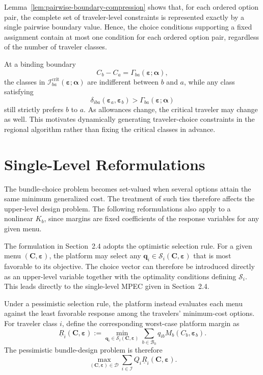 \documentclass{article}
\begin{document}
Lemma~\ref{lem:pairwise-boundary-compression} shows that, for each
ordered option pair, the complete set of traveler-level constraints is
represented exactly by a single pairwise boundary value. Hence, the
choice conditions supporting a fixed assignment contain at most
one condition for each ordered option pair, regardless of the number of
traveler classes.

At a binding boundary
\begin{equation}
    C_b-C_a
    =
    \Gamma_{ba}(\bm\varepsilon;\bm\alpha),
    \label{eq:binding-pairwise-boundary}
\end{equation}
the classes in
$\mathcal I^{\mathrm{crit}}_{ba}(\bm\varepsilon;\bm\alpha)$
are indifferent between $b$ and $a$, while any class satisfying
\begin{equation}
    \delta_{iba}(\bm\varepsilon_a,\bm\varepsilon_b)
    >
    \Gamma_{ba}(\bm\varepsilon;\bm\alpha)
\end{equation}
still strictly prefers $b$ to $a$. As allowances change, the critical
traveler may change as well. This motivates dynamically generating
traveler-choice constraints in the regional algorithm rather than fixing
the critical classes in advance.

\section{Single-Level Reformulations}
\label{sec:single-level-reformulations}

The bundle-choice problem becomes set-valued when several options attain
the same minimum generalized cost. The treatment of such ties therefore
affects the upper-level design problem. The following reformulations also
apply to a nonlinear $K_b$, since margins are fixed coefficients of the
response variables for any given menu.

The formulation in Section~2.4 adopts the optimistic selection rule.
For a given menu $(\bm C,\bm\varepsilon)$, the platform may select any
$\bm q_i\in\mathcal S_i(\bm C,\bm\varepsilon)$ that is most favorable
to its objective. The choice vector can therefore be introduced directly
as an upper-level variable together with the optimality conditions
defining $\mathcal S_i$. This leads directly to the single-level MPEC
given in Section~2.4.

Under a pessimistic selection rule, the platform instead evaluates each
menu against the least favorable response among the travelers'
minimum-cost options. For traveler class $i$, define the corresponding
worst-case platform margin as
\begin{equation}
    \underline{R}_i(\bm C,\bm\varepsilon)
    :=
    \min_{\bm q_i\in\mathcal S_i(\bm C,\bm\varepsilon)}
    \sum_{b\in\mathcal B_0}
    q_{ib}M_b(C_b,\bm\varepsilon_b).
    \label{eq:pessimistic-class-margin}
\end{equation}
The pessimistic bundle-design problem is therefore
\begin{equation}
    \max_{(\bm C,\bm\varepsilon)\in\mathcal D}
    \sum_{i\in\mathcal I}
    Q_i\underline{R}_i(\bm C,\bm\varepsilon).
    \label{eq:pessimistic-design}
\end{equation}
\end{document}
